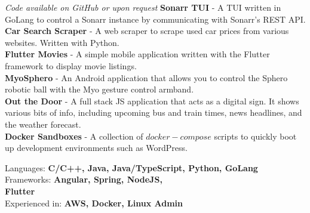 \textit{Code available on GitHub or upon request}
\textbf{Sonarr TUI} - A TUI written in GoLang to control a Sonarr instance 
    by communicating with Sonarr's REST API.\\
\textbf{Car Search Scraper} - A web scraper to scrape used car prices from various
    websites. Written with Python.\\
\textbf{Flutter Movies} - A simple mobile application written with the Flutter
    framework to display movie listings.\\
\textbf{MyoSphero} - An Android application that allows you to control the Sphero robotic ball
    with the Myo gesture control armband.\\
\textbf{Out the Door} - A full stack JS application that acts as a digital sign. It shows
    various bits of info, including upcoming bus and train times, news headlines, and the
    weather forecast.\\
\textbf{Docker Sandboxes} - A collection of $docker-compose$ scripts to quickly boot up
    development environments such as WordPress.



Languages: \textbf{C/C++, Java, Java/TypeScript, Python, GoLang} \\
Frameworks: \textbf{Angular, Spring, NodeJS, \\ Flutter} \\
Experienced in: \textbf{AWS, Docker, Linux Admin}






